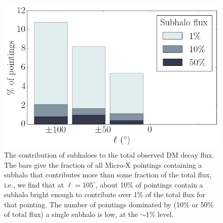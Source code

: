 \documentclass[aps,prd,10pt,twocolumn,superscriptaddress,showpacs,footinbib]{revtex4-1}
\begin{document}
\begin{figure}[h!]
\centering
\includegraphics[width=1.0\columnwidth]{subhalo_flux.png}
\caption{ 
	The contribution of subhaloes to the total observed DM decay flux. 
	The bars give the fraction of all Micro-X pointings containing a subhalo that
	contributes more than some fraction of the total flux, i.e., we find that at $\ell=105^\circ$,
	about 10\% of pointings contain a subhalo bright enough to contribute over 1\% of the total flux
	for that pointing. The number of pointings dominated by (10\% or 50\% of total flux) a single subhalo is low, at
	the $\sim$1\% level.
}
\label{fig:subhalo_flux}
\end{figure}
\end{document}
